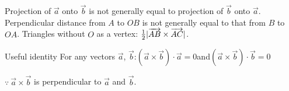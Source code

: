 \documentclass[a4paper]{book}
\newcommand{\vv}[1]{\overrightarrow{#1}}
\begin{document}
\begin{info}[title=Note, before skip=2mm, after skip=2mm]
Projection of $\vv a$ onto $\vv b$ is not generally equal to projection of $\vv b$ onto $\vv a$. Perpendicular distance from $A$ to $OB$ is not generally equal to that from $B$ to $OA$. Triangles without $O$ as a vertex: $\tfrac12|\overrightarrow{AB}\times\overrightarrow{AC}|$.
\end{info}
\begin{theorem}[before skip=0pt, after skip=0pt]{Useful identity}
For any vectors $\vv a$, $\vv b$:\quad $(\vv a\times\vv b)\cdot\vv a=0$\quad and\quad $(\vv a\times\vv b)\cdot\vv b=0$\par
$\because\ \vv a\times\vv b$ is perpendicular to $\vv a$ and $\vv b$.
\end{theorem}
\endgroup
\end{document}
